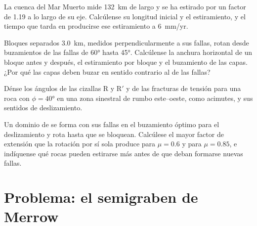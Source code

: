 \begin{exercise}[$\star\star$]\label{exo:b3:extension-strike-slip:9}
La cuenca del Mar Muerto mide \qty{132}{km} de largo y se ha estirado por un factor de 1.19
a lo largo de su eje. Calcúlense su longitud inicial y el estiramiento, y el tiempo
que tarda en producirse ese estiramiento a \qty{6}{mm/yr}.
\end{exercise}

\begin{exercise}[$\star\star\star$]\label{exo:b3:extension-strike-slip:10}
Bloques separados \qty{3.0}{km}, medidos perpendicularmente a sus fallas, rotan
desde buzamientos de las fallas de \ang{60} hasta \ang{45}. Calcúlense la anchura horizontal de un
bloque antes y después, el estiramiento por bloque y el buzamiento de las capas.
¿Por qué las capas deben buzar en sentido contrario al de las fallas?
\end{exercise}

\begin{exercise}[$\star\star\star$]\label{exo:b3:extension-strike-slip:11}
Dénse los ángulos de las cizallas R y R$'$ y de las fracturas de tensión para una
roca con $\phi = \ang{40}$ en una zona sinestral de rumbo este--oeste, como
acimutes, y sus sentidos de deslizamiento.
\end{exercise}

\begin{exercise}[$\star\star\star$]\label{exo:b3:extension-strike-slip:12}
Un dominio de  se forma con sus fallas en el buzamiento óptimo para el deslizamiento y
rota hasta que se bloquean. Calcúlese el mayor factor de extensión que la rotación
por sí sola produce para $\mu = 0.6$ y para $\mu = 0.85$, e indíquense qué
rocas pueden estirarse más antes de que deban formarse nuevas fallas.
\end{exercise}

\section{Problema: el semigraben de Merrow}

